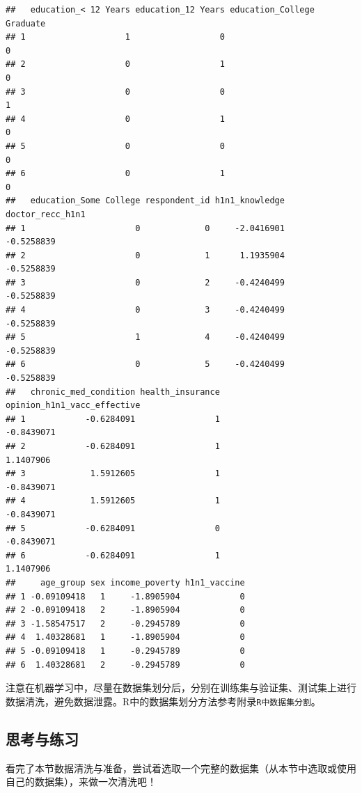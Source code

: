 \documentclass[]{ctexbook}
\newcommand{\passthrough}[1]{#1}
\begin{document}
\begin{lstlisting}
##   education_< 12 Years education_12 Years education_College Graduate
## 1                    1                  0                          0
## 2                    0                  1                          0
## 3                    0                  0                          1
## 4                    0                  1                          0
## 5                    0                  0                          0
## 6                    0                  1                          0
##   education_Some College respondent_id h1n1_knowledge doctor_recc_h1n1
## 1                      0             0     -2.0416901       -0.5258839
## 2                      0             1      1.1935904       -0.5258839
## 3                      0             2     -0.4240499       -0.5258839
## 4                      0             3     -0.4240499       -0.5258839
## 5                      1             4     -0.4240499       -0.5258839
## 6                      0             5     -0.4240499       -0.5258839
##   chronic_med_condition health_insurance opinion_h1n1_vacc_effective
## 1            -0.6284091                1                  -0.8439071
## 2            -0.6284091                1                   1.1407906
## 3             1.5912605                1                  -0.8439071
## 4             1.5912605                1                  -0.8439071
## 5            -0.6284091                0                  -0.8439071
## 6            -0.6284091                1                   1.1407906
##     age_group sex income_poverty h1n1_vaccine
## 1 -0.09109418   1     -1.8905904            0
## 2 -0.09109418   2     -1.8905904            0
## 3 -1.58547517   2     -0.2945789            0
## 4  1.40328681   1     -1.8905904            0
## 5 -0.09109418   1     -0.2945789            0
## 6  1.40328681   2     -0.2945789            0
\end{lstlisting}

注意在机器学习中，尽量在数据集划分后，分别在训练集与验证集、测试集上进行数据清洗，避免数据泄露。R中的数据集划分方法参考附录\passthrough{\lstinline!R中数据集分割!}。

\hypertarget{ux601dux8003ux4e0eux7ec3ux4e60}{%
\subsection{思考与练习}\label{ux601dux8003ux4e0eux7ec3ux4e60}}

看完了本节数据清洗与准备，尝试着选取一个完整的数据集（从本节中选取或使用自己的数据集），来做一次清洗吧！
\end{document}
